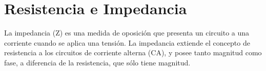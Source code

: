 \documentclass{article}
\begin{document}
\section{Resistencia e Impedancia}

La impedancia (Z) es una medida de oposición que presenta un circuito a una corriente cuando se aplica una tensión. La impedancia extiende el concepto de resistencia a los circuitos de corriente alterna (CA), y posee tanto magnitud como fase, a diferencia de la resistencia, que sólo tiene magnitud.\\



 
 
 
 
 
 
 
 

 









\end{document}

